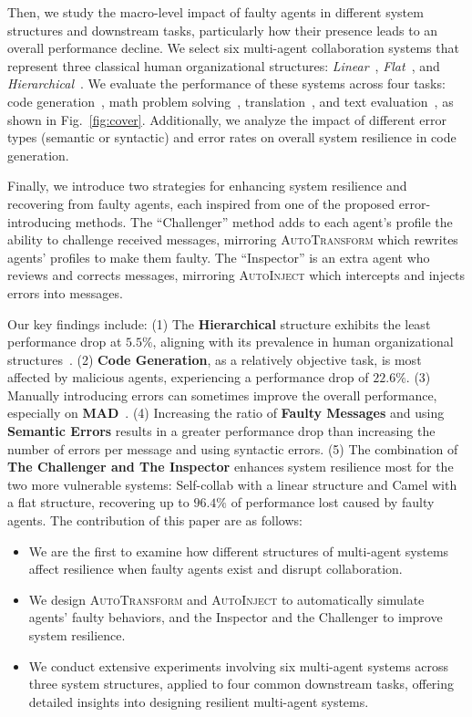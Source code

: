 \documentclass{article}
\theoremstyle{plain}
\theoremstyle{definition}
\theoremstyle{remark}
\begin{document}
Then, we study the macro-level impact of faulty agents in different system structures and downstream tasks, particularly how their presence leads to an overall performance decline.
We select six multi-agent collaboration systems that represent three classical human organizational structures: \textit{Linear}~\cite{hong2023metagpt, dong2023self}, \textit{Flat}~\cite{li2024camel, wang2023unleashing}, and \textit{Hierarchical}~\cite{chen2023agentverse, liang2023encouraging}.
We evaluate the performance of these systems across four tasks: code generation~\cite{chen2021evaluating}, math problem solving~\cite{liang2023encouraging}, translation~\cite{he2020box}, and text evaluation~\cite{wang2023large}, as shown in Fig.~\ref{fig:cover}.
Additionally, we analyze the impact of different error types (semantic or syntactic) and error rates on overall system resilience in code generation.

Finally, we introduce two strategies for enhancing system resilience and recovering from faulty agents, each inspired from one of the proposed error-introducing methods.
The ``Challenger'' method adds to each agent's profile the ability to challenge received messages, mirroring \textsc{AutoTransform} which rewrites agents' profiles to make them faulty.
The ``Inspector'' is an extra agent who reviews and corrects messages, mirroring \textsc{AutoInject} which intercepts and injects errors into messages.

Our key findings include:
(1) The \textbf{Hierarchical} structure exhibits the least performance drop at $5.5\%$, aligning with its prevalence in human organizational structures~\cite{mihm2010hierarchical}.
(2) \textbf{Code Generation}, as a relatively objective task, is most affected by malicious agents, experiencing a performance drop of $22.6\%$.
(3) Manually introducing errors can sometimes improve the overall performance, especially on \textbf{MAD}~\cite{liang2023encouraging}.
(4) Increasing the ratio of \textbf{Faulty Messages} and using \textbf{Semantic Errors} results in a greater performance drop than
increasing the number of errors per message and using syntactic errors.
(5) The combination of \textbf{The Challenger and The Inspector} enhances system resilience most for the two more vulnerable systems: Self-collab with a linear structure and Camel with a flat structure, recovering up to $96.4\%$ of performance lost caused by faulty agents.
The contribution of this paper are as follows:
\begin{itemize}[leftmargin=*]
    \item We are the first to examine how different structures of multi-agent systems affect resilience when faulty agents exist and disrupt collaboration.
    \item We design \textsc{AutoTransform} and \textsc{AutoInject} to automatically simulate agents' faulty behaviors, and the Inspector and the Challenger to improve system resilience.
    \item We conduct extensive experiments involving six multi-agent systems across three system structures, applied to four common downstream tasks, offering detailed insights into designing resilient multi-agent systems.
\end{itemize}
\end{document}

